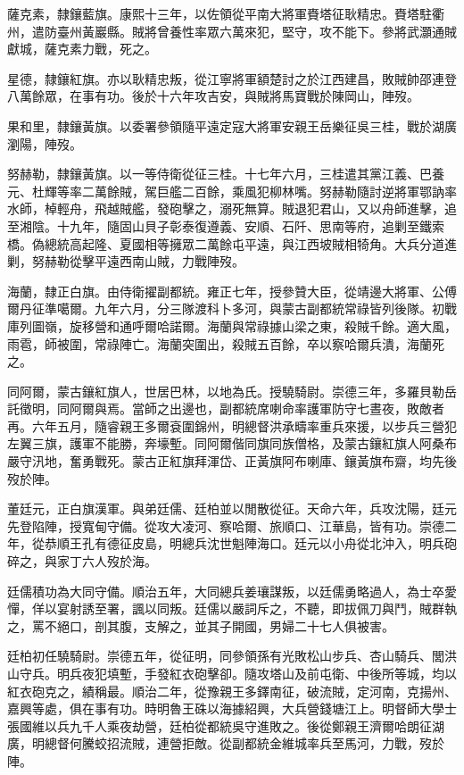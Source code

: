 \begin{pinyinscope}
薩克素，隸鑲藍旗。康熙十三年，以佐領從平南大將軍賚塔征耿精忠。賚塔駐衢州，遣防臺州黃巖縣。賊將曾養性率眾六萬來犯，堅守，攻不能下。參將武灝通賊獻城，薩克素力戰，死之。

星德，隸鑲紅旗。亦以耿精忠叛，從江寧將軍額楚討之於江西建昌，敗賊帥邵連登八萬餘眾，在事有功。後於十六年攻吉安，與賊將馬寶戰於陳岡山，陣歿。

果和里，隸鑲黃旗。以委署參領隨平遠定寇大將軍安親王岳樂征吳三桂，戰於湖廣瀏陽，陣歿。

努赫勒，隸鑲黃旗。以一等侍衛從征三桂。十七年六月，三桂遣其黨江義、巴養元、杜輝等率二萬餘賊，駕巨艦二百餘，乘風犯柳林嘴。努赫勒隨討逆將軍鄂訥率水師，棹輕舟，飛越賊艦，發砲擊之，溺死無算。賊退犯君山，又以舟師進擊，追至湘陰。十九年，隨固山貝子彰泰復遵義、安順、石阡、思南等府，追剿至鐵索橋。偽總統高起隆、夏國相等擁眾二萬餘屯平遠，與江西坡賊相犄角。大兵分道進剿，努赫勒從擊平遠西南山賊，力戰陣歿。

海蘭，隸正白旗。由侍衛擢副都統。雍正七年，授參贊大臣，從靖邊大將軍、公傅爾丹征準噶爾。九年六月，分三隊渡科卜多河，與蒙古副都統常祿皆列後隊。初戰庫列圖嶺，旋移營和通呼爾哈諾爾。海蘭與常祿據山梁之東，殺賊千餘。適大風，雨雹，師被圍，常祿陣亡。海蘭突圍出，殺賊五百餘，卒以察哈爾兵潰，海蘭死之。

同阿爾，蒙古鑲紅旗人，世居巴林，以地為氏。授驍騎尉。崇德三年，多羅貝勒岳託徵明，同阿爾與焉。當師之出邊也，副都統席喇命率護軍防守七晝夜，敗敵者再。六年五月，隨睿親王多爾袞圍錦州，明總督洪承疇率重兵來援，以步兵三營犯左翼三旗，護軍不能勝，奔壕塹。同阿爾偕同旗同族僧格，及蒙古鑲紅旗人阿桑布嚴守汛地，奮勇戰死。蒙古正紅旗拜渾岱、正黃旗阿布喇庫、鑲黃旗布齋，均先後歿於陣。

董廷元，正白旗漢軍。與弟廷儒、廷柏並以閒散從征。天命六年，兵攻沈陽，廷元先登陷陣，授寬甸守備。從攻大凌河、察哈爾、旅順口、江華島，皆有功。崇德二年，從恭順王孔有德征皮島，明總兵沈世魁陣海口。廷元以小舟從北沖入，明兵砲碎之，與家丁六人歿於海。

廷儒積功為大同守備。順治五年，大同總兵姜瓖謀叛，以廷儒勇略過人，為士卒愛憚，佯以宴射誘至署，諷以同叛。廷儒以嚴詞斥之，不聽，即拔佩刀與鬥，賊群執之，罵不絕口，剖其腹，支解之，並其子開國，男婦二十七人俱被害。

廷柏初任驍騎尉。崇德五年，從征明，同參領孫有光敗松山步兵、杏山騎兵、閭洪山守兵。明兵夜犯填塹，手發紅衣砲擊卻。隨攻塔山及前屯衛、中後所等城，均以紅衣砲克之，績稱最。順治二年，從豫親王多鐸南征，破流賊，定河南，克揚州、嘉興等處，俱在事有功。時明魯王硃以海據紹興，大兵營錢塘江上。明督師大學士張國維以兵九千人乘夜劫營，廷柏從都統吳守進敗之。後從鄭親王濟爾哈朗征湖廣，明總督何騰蛟招流賊，連營拒敵。從副都統金維城率兵至馬河，力戰，歿於陣。


\end{pinyinscope}
